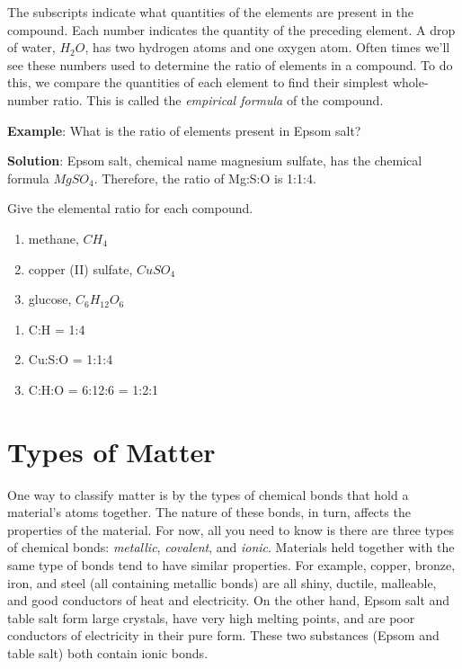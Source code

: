 The subscripts indicate what quantities of the elements are present in the compound. 
Each number indicates the quantity of the preceding element. A drop of water, 
$H_2O$, has two hydrogen atoms and one oxygen atom. Often times we'll see these
numbers used to determine the ratio of elements in a compound. To do this, we 
compare the quantities of each element to find their simplest whole-number ratio. 
This is called the \textit{empirical formula} of the compound.

\textbf{Example}: What is the ratio of elements present in Epsom salt?

\textbf{Solution}: Epsom salt, chemical name magnesium sulfate, has the chemical formula $MgSO_4$. Therefore, the ratio of Mg:S:O is 1:1:4. 

\begin{Exercise}[title = {Ratios of Atoms in Molecules}, label = num_atom]
Give the elemental ratio for each compound. 
\begin{enumerate}
\item methane, $CH_4$
\item copper (II) sulfate, $CuSO_4$
\item glucose, $C_6H_{12}O_6$
\end{enumerate}
\end{Exercise}

\begin{Answer}[ref = num_atom]
\begin{enumerate}
\item C:H = 1:4
\item Cu:S:O = 1:1:4
\item C:H:O = 6:12:6 = 1:2:1
\end{enumerate}
\end{Answer}

\section{Types of Matter}
One way to classify matter is by the types of chemical bonds that hold a 
material's atoms together. The nature of these bonds, in turn, affects the 
properties of the material. For now, all you need to know is there are three types
of chemical bonds: \textit{metallic}, \textit{covalent}, and \textit{ionic}. Materials held together with the
same type of bonds tend to have similar properties. For example, copper, bronze, 
iron, and steel (all containing metallic bonds) are all shiny, ductile, malleable,
and good conductors of heat and electricity. On the other hand, Epsom salt and 
table salt form large crystals, have very high melting points, and are poor 
conductors of electricity in their pure form. These two substances (Epsom and 
table salt) both contain ionic bonds. 


